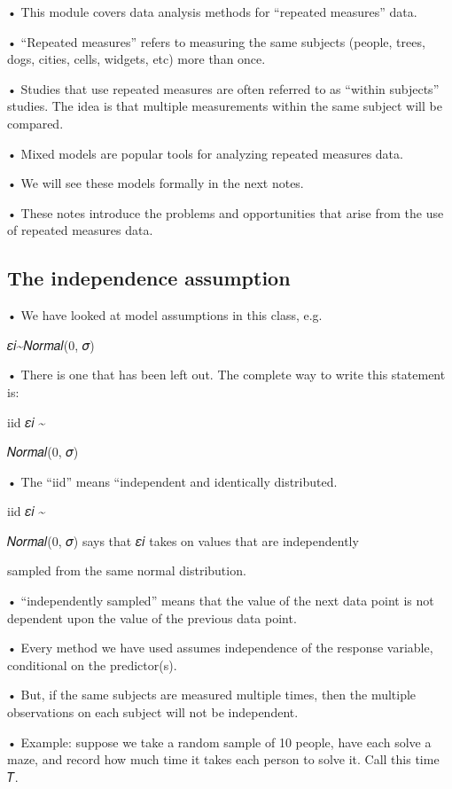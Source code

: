 \documentclass[
  letterpaper,
  DIV=11,
  numbers=noendperiod]{scrreprt}
\begin{document}
• This module covers data analysis methods for ``repeated measures''
data.

• ``Repeated measures'' refers to measuring the same subjects (people,
trees, dogs, cities, cells, widgets, etc) more than once.

• Studies that use repeated measures are often referred to as ``within
subjects'' studies. The idea is that multiple measurements within the
same subject will be compared.

• Mixed models are popular tools for analyzing repeated measures data.

• We will see these models formally in the next notes.

• These notes introduce the problems and opportunities that arise from
the use of repeated measures data.

\hypertarget{the-independence-assumption}{%
\subsection{The independence
assumption}\label{the-independence-assumption}}

• We have looked at model assumptions in this class, e.g.

𝜀𝑖\textasciitilde 𝑁𝑜𝑟𝑚𝑎𝑙(0, 𝜎)

• There is one that has been left out. The complete way to write this
statement is:

iid 𝜀𝑖 \textasciitilde{}

𝑁𝑜𝑟𝑚𝑎𝑙(0, 𝜎)

• The ``iid'' means ``independent and identically distributed.

iid 𝜀𝑖 \textasciitilde{}

𝑁𝑜𝑟𝑚𝑎𝑙(0, 𝜎) says that 𝜀𝑖 takes on values that are independently

sampled from the same normal distribution.

• ``independently sampled'' means that the value of the next data point
is not dependent upon the value of the previous data point.

• Every method we have used assumes independence of the response
variable, conditional on the predictor(s).

• But, if the same subjects are measured multiple times, then the
multiple observations on each subject will not be independent.

• Example: suppose we take a random sample of 10 people, have each solve
a maze, and record how much time it takes each person to solve it. Call
this time 𝑇.
\end{document}
